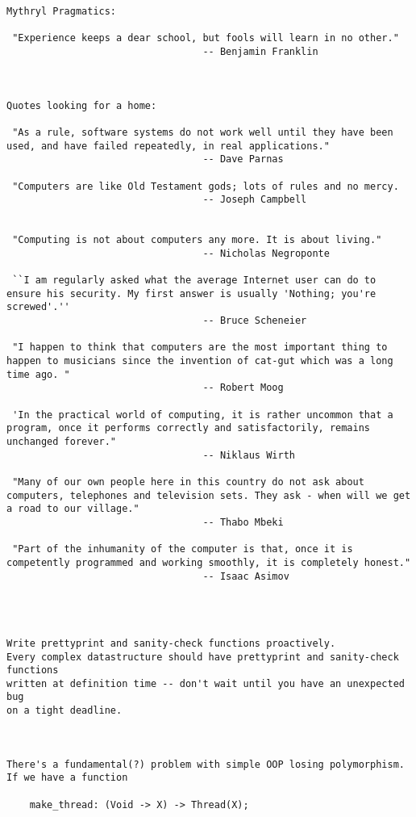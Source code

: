 \begin{verbatim}
Mythryl Pragmatics:

 "Experience keeps a dear school, but fools will learn in no other."
                                  -- Benjamin Franklin



Quotes looking for a home:

 "As a rule, software systems do not work well until they have been used, and have failed repeatedly, in real applications."
                                  -- Dave Parnas 

 "Computers are like Old Testament gods; lots of rules and no mercy. 
                                  -- Joseph Campbell 


 "Computing is not about computers any more. It is about living."
                                  -- Nicholas Negroponte 

 ``I am regularly asked what the average Internet user can do to ensure his security. My first answer is usually 'Nothing; you're screwed'.'' 
                                  -- Bruce Scheneier 

 "I happen to think that computers are the most important thing to happen to musicians since the invention of cat-gut which was a long time ago. "
                                  -- Robert Moog 

 'In the practical world of computing, it is rather uncommon that a program, once it performs correctly and satisfactorily, remains unchanged forever."
                                  -- Niklaus Wirth 

 "Many of our own people here in this country do not ask about computers, telephones and television sets. They ask - when will we get a road to our village."
                                  -- Thabo Mbeki 

 "Part of the inhumanity of the computer is that, once it is competently programmed and working smoothly, it is completely honest."
                                  -- Isaac Asimov 




Write prettyprint and sanity-check functions proactively.
Every complex datastructure should have prettyprint and sanity-check functions
written at definition time -- don't wait until you have an unexpected bug
on a tight deadline.



There's a fundamental(?) problem with simple OOP losing polymorphism.
If we have a function

    make_thread: (Void -> X) -> Thread(X);


\end{verbatim}
